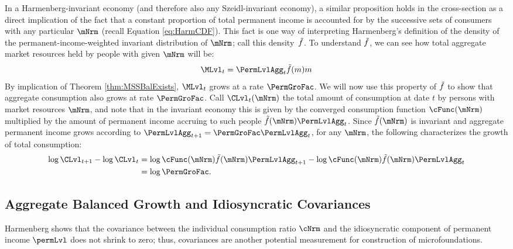 \documentclass[\econtexRoot/BufferStockTheory]{subfiles}
\begin{document}
In a Harmenberg-invariant economy (and therefore also any Szeidl-invariant economy), a similar proposition holds in the cross-section as a direct implication of the fact that a constant proportion of total permanent income is accounted for by the successive sets of consumers with any particular $\mNrm$ (recall Equation \eqref{eq:HarmCDF}).
This fact is one way of interpreting Harmenberg's definition of the density of the permanent-income-weighted invariant distribution of $\mNrm$; call this density~$\tilde{f}$.
To understand $\tilde{f}$, we can see how total aggregate market resources held by people with given $\mNrm$ will be:
%
%
\begin{equation}
\MLvl_{t}=\PermLvlAgg_{t}\Harm{f}(m)m
\end{equation}
%
%
By implication of Theorem \ref{thm:MSSBalExists}, $\MLvl_{t}$ grows at a rate $\PermGroFac$.
We will now use this property of $\tilde{f}$ to show that aggregate consumption also grows at rate $\PermGroFac$.
Call $\CLvl_{t}(\mNrm)$ the total amount of consumption at date $t$ by persons with market resources $\mNrm$, and note that in the invariant economy this is given by the converged consumption function $\cFunc(\mNrm)$ multiplied by the amount of permanent income accruing to such people $\Harm{f}(\mNrm)\PermLvlAgg_{t}$.
Since $\Harm{f}(\mNrm)$ is invariant and aggregate permanent income grows according to $\PermLvlAgg_{t+1} = \PermGroFac \PermLvlAgg_{t}$, for any $\mNrm$, the following characterizes the growth of total consumption:
%
%
\begin{equation*}
  \begin{aligned}
    \log \CLvl_{t+1} - \log \CLvl_{t} &  \notag
    = \log \cFunc(\mNrm) \Harm{f}(\mNrm)\PermLvlAgg_{t+1} - \log \cFunc(\mNrm)\Harm{f}(\mNrm)\PermLvlAgg_{t} \\
    & = \log \PermGroFac.
  \end{aligned}
\end{equation*}



\hypertarget{Balanced-Growth-Of-Covariances}{}
\subsection{Aggregate Balanced Growth and Idiosyncratic Covariances}\label{subsec:Covariances}

Harmenberg shows that the covariance between the individual consumption ratio $\cNrm$ and the idiosyncratic component of permanent income $\permLvl$ does not shrink to zero; thus, covariances are another potential measurement for construction of microfoundations.
\end{document}
